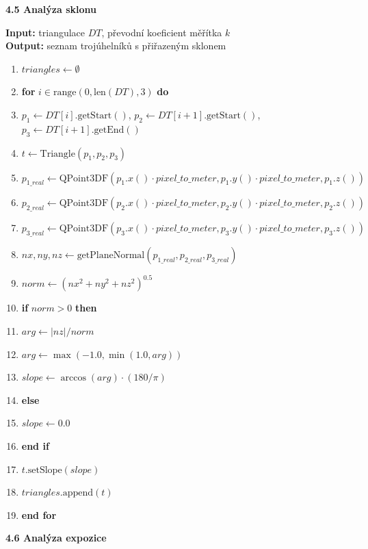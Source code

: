\documentclass[12pt]{article}
\begin{document}
\newpage
\textbf{4.5 Analýza sklonu}

\textbf{Input:} triangulace $DT$, převodní koeficient měřítka $k$ \\
\textbf{Output:} seznam trojúhelníků s přiřazeným sklonem

\begin{enumerate}
    \item $triangles \leftarrow \emptyset$
    \item \textbf{for} $i \in \text{range}(0, \text{len}(DT), 3)$ \textbf{do}
    \item \quad $p_1 \leftarrow DT[i].\text{getStart}()$, $p_2 \leftarrow DT[i+1].\text{getStart}()$, $p_3 \leftarrow DT[i+1].\text{getEnd}()$
    \item \quad $t \leftarrow \text{Triangle}(p_1, p_2, p_3)$
    \item \quad $p_{1\_real} \leftarrow \text{QPoint3DF}(p_1.x() \cdot pixel\_to\_meter, p_1.y() \cdot pixel\_to\_meter, p_1.z())$
    \item \quad $p_{2\_real} \leftarrow \text{QPoint3DF}(p_2.x() \cdot pixel\_to\_meter, p_2.y() \cdot pixel\_to\_meter, p_2.z())$
    \item \quad $p_{3\_real} \leftarrow \text{QPoint3DF}(p_3.x() \cdot pixel\_to\_meter, p_3.y() \cdot pixel\_to\_meter, p_3.z())$
    \item \quad $nx, ny, nz \leftarrow \text{getPlaneNormal}(p_{1\_real}, p_{2\_real}, p_{3\_real})$
    \item \quad $norm \leftarrow (nx^2 + ny^2 + nz^2)^{0.5}$
    \item \quad \textbf{if} $norm > 0$ \textbf{then}
    \item \quad \quad $arg \leftarrow |nz| / norm$
    \item \quad \quad $arg \leftarrow \max(-1.0, \min(1.0, arg))$
    \item \quad \quad $slope \leftarrow \arccos(arg) \cdot (180 / \pi)$
    \item \quad \textbf{else}
    \item \quad \quad $slope \leftarrow 0.0$
    \item \quad \textbf{end if}
    \item \quad $t.\text{setSlope}(slope)$
    \item \quad $triangles.\text{append}(t)$
    \item \textbf{end for}
\end{enumerate}

\newpage
\textbf{4.6 Analýza expozice}
\end{document}
